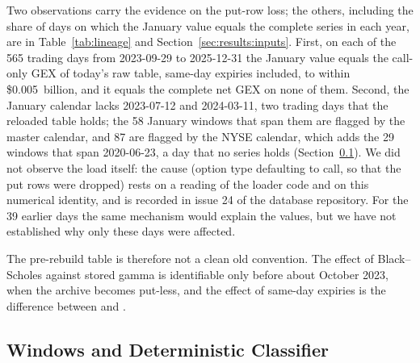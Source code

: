 Two observations carry the evidence on the put-row loss; the others, including the share of days on which the January value equals the complete series in each year, are in Table~\ref{tab:lineage} and Section~\ref{sec:results:inputs}. First, on each of the 565 trading days from 2023-09-29 to 2025-12-31 the January value equals the call-only GEX of today's raw table, same-day expiries included, to within \$0.005~billion, and it equals the complete net GEX on none of them. Second, the January calendar lacks 2023-07-12 and 2024-03-11, two trading days that the reloaded table holds; the 58 January windows that span them are flagged by the master calendar, and 87 are flagged by the NYSE calendar, which adds the 29 windows that span 2020-06-23, a day that no series holds (Section~\ref{sec:methods:windows}). We did not observe the load itself: the cause (option type defaulting to call, so that the put rows were dropped) rests on a reading of the loader code and on this numerical identity, and is recorded in issue 24 of the database repository. For the 39 earlier days the same mechanism would explain the values, but we have not established why only these days were affected.

The pre-rebuild table is therefore not a clean old convention. The effect of Black--Scholes against stored gamma is identifiable only before about October 2023, when the archive becomes put-less, and the effect of same-day expiries is the difference between  and .

\subsection{Windows and Deterministic Classifier}
\label{sec:methods:windows}

